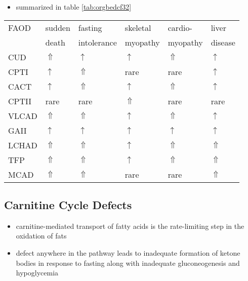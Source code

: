 \documentclass[12pt]{scrartcl}
\begin{document}
\begin{itemize}
\item summarized in table \ref{tab:orgbedcf32}
\end{itemize}
\begin{center}
\begin{tabular}{llllll}
FAOD & sudden & fasting & skeletal & cardio- & liver\\
 & death & intolerance & myopathy & myopathy & disease\\
\hline
CUD & \(\Uparrow\) & \(\uparrow\) & \(\uparrow\) & \(\Uparrow\) & \(\uparrow\)\\
CPTI & \(\uparrow\) & \(\Uparrow\) & rare & rare & \(\uparrow\)\\
CACT & \(\uparrow\) & \(\Uparrow\) & \(\uparrow\) & \(\Uparrow\) & \(\uparrow\)\\
CPTII & rare & rare & \(\Uparrow\) & rare & rare\\
VLCAD & \(\Uparrow\) & \(\Uparrow\) & \(\uparrow\) & \(\Uparrow\) & \(\uparrow\)\\
GAII & \(\uparrow\) & \(\uparrow\) & \(\uparrow\) & \(\uparrow\) & \(\uparrow\)\\
LCHAD & \(\Uparrow\) & \(\Uparrow\) & \(\uparrow\) & \(\Uparrow\) & \(\Uparrow\)\\
TFP & \(\Uparrow\) & \(\Uparrow\) & \(\uparrow\) & \(\Uparrow\) & \(\Uparrow\)\\
MCAD & \(\Uparrow\) & \(\Uparrow\) & rare & rare & \(\Uparrow\)\\
\end{tabular}
\end{center}

\subsection{Carnitine Cycle Defects}
\label{sec:org6ee2b43}
\begin{itemize}
\item carnitine-mediated transport of fatty acids is the rate-limiting
step in the oxidation of fats
\item defect anywhere in the pathway leads to inadequate formation of
ketone bodies in response to fasting along with inadequate
gluconeogenesis and hypoglycemia
\end{itemize}
\end{document}
